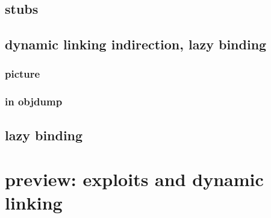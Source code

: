 

\subsection{stubs}


\subsection{dynamic linking indirection, lazy binding}
\subsubsection{picture}



\subsubsection{in objdump}


\subsection{lazy binding}


\section{preview: exploits and dynamic linking}


